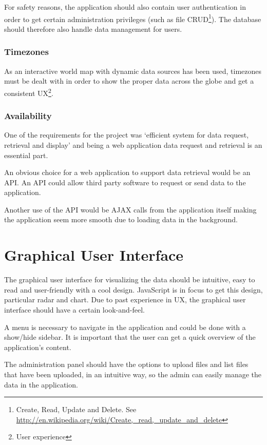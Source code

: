 For safety reasons, the application should also contain user authentication in order to get certain administration privileges (such as file CRUD\footnote{Create, Read, Update and Delete. See \url{http://en.wikipedia.org/wiki/Create,_read,_update_and_delete}}). The database should therefore also handle data management for users.

\subsubsection{Timezones}
\label{sec:analysis_timezones}
As an interactive world map with dynamic data sources has been used, timezones must be dealt with in order to show the proper data across the globe and get a consistent UX\footnote{User experience}.

\subsubsection{Availability}
\label{sec:availability}
One of the requirements for the project was `efficient system for data request, retrieval and display' and being a web application data request and retrieval is an essential part.

An obvious choice for a web application to support data retrieval would be an API. An API could allow third party software to request or send data to the application. 

Another use of the API would be AJAX calls from the application itself making the application seem more smooth due to loading data in the background.

\section{Graphical User Interface}
\label{sec:graphical_user_interface}
The graphical user interface for visualizing the data should be intuitive, easy to read and user-friendly with a cool design. JavaScript is in focus to get this design, particular radar and chart.
Due to past experience in UX, the graphical user interface should have a certain look-and-feel.

A menu is necessary to navigate in the application and could be done with a show/hide sidebar. It is important that the user can get a quick overview of the application's content.

The administration panel should have the options to upload files and list files that have been uploaded, in an intuitive way, so the admin can easily manage the data in the application.

